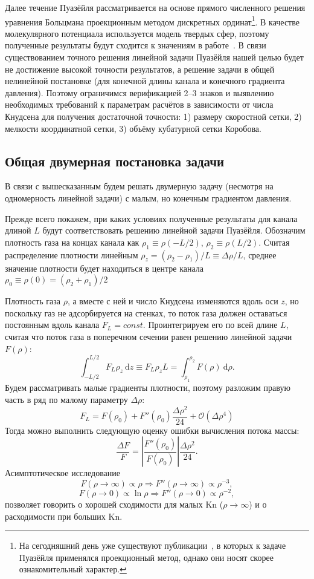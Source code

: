 \documentclass[a4paper,12pt]{article}
\newcommand{\dd}{\:\mathrm{d}}
\newcommand{\Kn}{\mathrm{Kn}}
\begin{document}
Далее течение Пуазёйля рассматривается на основе прямого численного решения уравнения Больцмана
проекционным методом дискретных ординат\footnote
{
	На сегодняшний день уже существуют публикации~\cite{Aristov2009}, в которых к задаче Пуазёйля применялся проекционный метод,
	однако они носят скорее ознакомительный характер.
}.
В качестве молекулярного потенциала используется модель твердых сфер,
поэтому полученные результаты будут сходится к значениям в работе~\cite{Ohwada1989b}.
В связи существованием точного решения линейной задачи Пуазёйля нашей целью будет не достижение высокой точности результатов,
а решение задачи в общей нелинейной постановке (для конечной длины канала и конечного градиента давления).
Поэтому ограничимся верификацией 2--3 знаков и выявлению необходимых требований к параметрам расчётов
в зависимости от числа Кнудсена для получения достаточной точности:
1) размеру скоростной сетки, 2) мелкости координатной сетки, 3) объёму кубатурной сетки Коробова.

\subsection{Общая двумерная постановка задачи}

В связи с вышесказанным будем решать двумерную задачу (несмотря на одномерность линейной задачи)
с малым, но конечным градиентом давления.

Прежде всего покажем, при каких условиях полученные результаты для канала длиной \(L\)
будут соответствовать решению линейной задачи Пуазёйля.
Обозначим плотность газа на концах канала как \(\rho_1\equiv\rho(-L/2)\), \(\rho_2\equiv\rho(L/2)\).
Считая распределение плотности линейным \(\rho_z = (\rho_2-\rho_1)/L \equiv \Delta\rho/L\),
среднее значение плотности будет находиться в центре канала \(\rho_0\equiv\rho(0) = (\rho_2+\rho_1)/2\)

Плотность газа \(\rho\), а вместе с ней и число Кнудсена изменяются вдоль оси \(z\),
но поскольку газ не адсорбируется на стенках, то поток газа должен оставаться постоянным вдоль канала \(F_L=const\).
Проинтегрируем его по всей длине \(L\), считая что поток газа в поперечном сечении равен решению линейной задачи \(F(\rho)\):
\[ \int_{-L/2}^{L/2}F_L\rho_z\dd z \equiv F_L\rho_zL = \int_{\rho_1}^{\rho_2} F(\rho)\dd\rho. \]
Будем рассматривать малые градиенты плотности, поэтому разложим правую часть в ряд по малому параметру \(\Delta\rho\):
\[ F_L = F(\rho_0) + F''(\rho_0) \frac{\Delta\rho^2}{24} + \mathcal{O}(\Delta\rho^4) \]
Тогда можно выполнить следующую оценку ошибки вычисления потока массы:
\[ \frac{\Delta F}{F} = \left|\frac{F''(\rho_0)}{F(\rho_0)}\right|\frac{\Delta\rho^2}{24}. \]
Асимптотическое исследование
\[ F(\rho\rightarrow\infty) \propto \rho \Rightarrow F''(\rho\rightarrow\infty) \propto \rho^{-3}, \]
\[ F(\rho\rightarrow0) \propto \ln\rho \Rightarrow F''(\rho\rightarrow0) \propto \rho^{-2}, \]
позволяет говорить о хорошей сходимости для малых \(\Kn\) (\(\rho\rightarrow\infty\)) и о расходимости при больших \(\Kn\).
\end{document}

